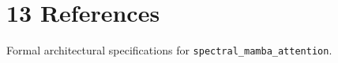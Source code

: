 \section{13 References}

Formal architectural specifications for \texttt{spectral_mamba_attention}.
